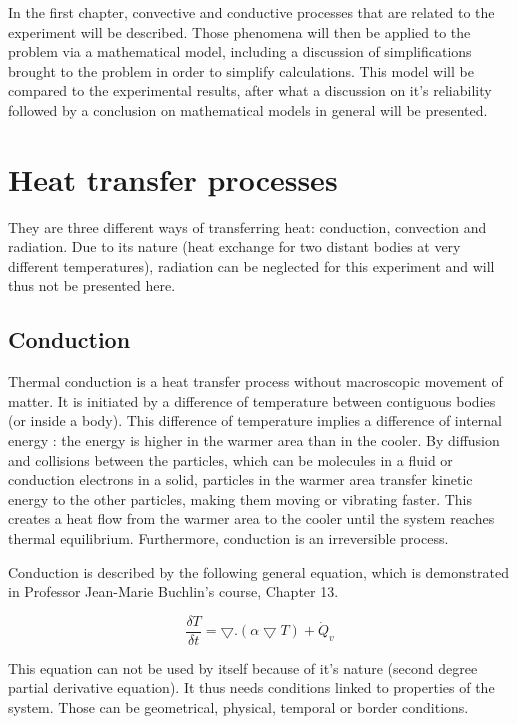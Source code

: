 \documentclass{report}
\begin{document}
	In the first chapter, convective and conductive processes that are related to the experiment will be described. Those phenomena will then be applied to the problem via a mathematical model, including a discussion of simplifications brought to the problem in order to simplify calculations. This model will be compared to the experimental results, after what a discussion on it's reliability followed by a conclusion on mathematical models in general will be presented.
	
	\chapter{Heat transfer processes}\label{htp}
	
	They are three different ways of transferring heat: conduction, convection and radiation. Due to its nature (heat exchange for two distant bodies at very different temperatures), radiation can be neglected for this experiment and will thus not be presented here.
	
	\section{Conduction}\label{cd}
	
	Thermal conduction is a heat transfer process without macroscopic movement of matter. It is initiated by a difference of temperature between contiguous bodies (or inside a body). This difference of temperature implies a difference of internal energy : the energy is higher in the warmer area than in the cooler. By diffusion and collisions between the particles, which can be molecules in a fluid or conduction electrons in a solid, particles in the warmer area transfer kinetic energy to the other particles, making them moving or vibrating faster. This creates a heat flow from the warmer area to the cooler until the system reaches thermal equilibrium. Furthermore, conduction is an irreversible process.
	
	Conduction is described by the following general equation, which is demonstrated in Professor Jean-Marie Buchlin's course\cite{Buchlin}, Chapter 13.
	
	\begin{equation}
		\frac{\delta T}{\delta t} = \bigtriangledown . (\alpha \bigtriangledown T)+ \dot{Q}_v
	\end{equation}
	
	This equation can not be used by itself because of it's nature (second degree partial derivative equation). It thus needs conditions linked to properties of the system. Those can be geometrical, physical, temporal or border conditions.
	
\end{document}
